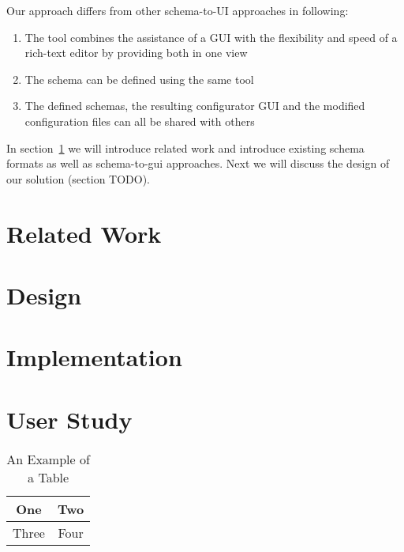 \documentclass[lettersize,journal]{IEEEtran}
\begin{document}
 Our approach differs from other schema-to-UI approaches in following:

 \begin{enumerate}
  \item The tool combines the assistance of a GUI with the flexibility and speed of a rich-text editor by providing both in one view
  \item The schema can be defined using the same tool
  \item The defined schemas, the resulting configurator GUI and the modified configuration files can all be shared with others
 \end{enumerate}


 In section~\ref{sec:research} we will introduce related work and introduce existing schema formats as well as schema-to-gui approaches.
 Next we will discuss the design of our solution (section TODO).




 \section{Related Work}\label{sec:research}
 


 \section{Design}\label{sec:design}
 


 \section{Implementation}\label{sec:implementation}
 

 \section{User Study}\label{sec:user_study}
 

 \begin{table}[!t]
  \caption{An Example of a Table\label{tab:table1}}
  \centering
  \begin{tabular}{|c||c|}
   \hline
   One   & Two  \\
   \hline
   Three & Four \\
   \hline
  \end{tabular}
 \end{table}
\end{document}
